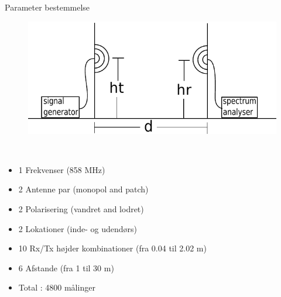 \begin{frame}{Parameter bestemmelse}
\begin{figure}[!htbp]
	\centering
	\includegraphics[width = 0.8\columnwidth]{figures/setup.pdf}
\end{figure}
\begin{minipage}{0.15\textwidth}
 \textcolor{white}{.}  
\end{minipage}%
\begin{minipage}{0.8\textwidth}
\begin{itemize}
\item 1 Frekvenser (858 MHz)
\item 2 Antenne par (monopol and patch)
\item 2 Polarisering (vandret and lodret)
\item 2 Lokationer (inde- og udendørs)
\item 10 Rx/Tx højder kombinationer (fra 0.04 til 2.02 m)
\item 6 Afstande (fra 1 til 30 m)
\item Total : 4800 målinger
\end{itemize}
\end{minipage}
\end{frame}